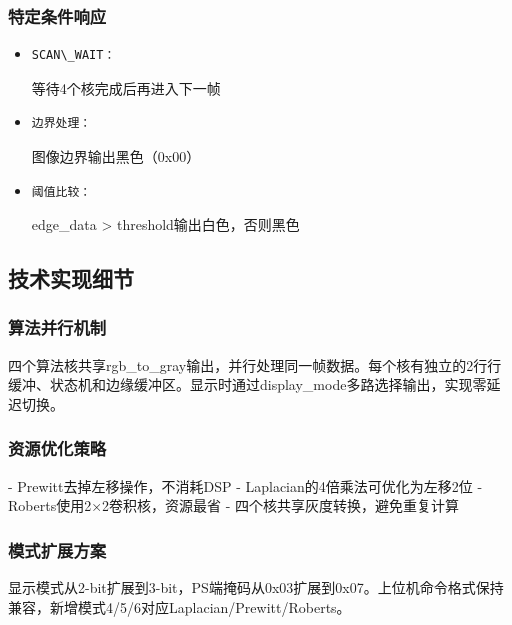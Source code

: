 \subsubsection{特定条件响应}

\begin{itemize}
    \item \begin{verbatim}SCAN\_WAIT：\end{verbatim}等待4个核完成后再进入下一帧
    \item \begin{verbatim}边界处理：\end{verbatim}图像边界输出黑色（0x00）
    \item \begin{verbatim}阈值比较：\end{verbatim}edge\_data > threshold输出白色，否则黑色
\end{itemize}

\subsection{技术实现细节}

\subsubsection{算法并行机制}

四个算法核共享rgb\_to\_gray输出，并行处理同一帧数据。每个核有独立的2行行缓冲、状态机和边缘缓冲区。显示时通过display\_mode多路选择输出，实现零延迟切换。

\subsubsection{资源优化策略}

- Prewitt去掉左移操作，不消耗DSP
- Laplacian的4倍乘法可优化为左移2位
- Roberts使用2×2卷积核，资源最省
- 四个核共享灰度转换，避免重复计算

\subsubsection{模式扩展方案}

显示模式从2-bit扩展到3-bit，PS端掩码从0x03扩展到0x07。上位机命令格式保持兼容，新增模式4/5/6对应Laplacian/Prewitt/Roberts。
